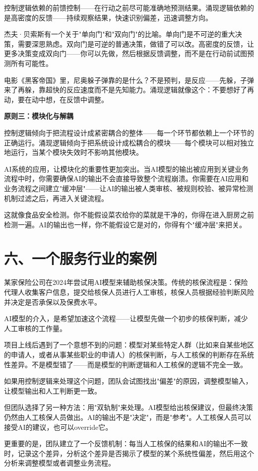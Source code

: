 控制逻辑依赖的前馈控制——在行动之前尽可能准确地预测结果。涌现逻辑依赖的是高密度的反馈——持续观察结果，快速识别偏差，迅速调整方向。

杰夫·贝索斯有一个关于"单向门"和"双向门"的比喻。单向门是不可逆的重大决策，需要深思熟虑。双向门是可逆的普通决策，做错了可以改。高密度的反馈，让更多决策变成双向门——你可以先做，然后根据反馈调整，而不是在行动前试图预测所有可能性。

电影《黑客帝国》里，尼奥躲子弹靠的是什么？不是预判，是反应——先躲，子弹来了再躲，靠超快的反应速度而不是先知能力。涌现逻辑就像这个：不要想好了再动，要在动中想，在反馈中调整。

\textbf{原则三：模块化与解耦}

控制逻辑倾向于把流程设计成紧密耦合的整体——每一个环节都依赖上一个环节的正确运行。涌现逻辑倾向于把系统设计成松耦合的模块——每个模块可以相对独立地运行，当某个模块失效时不影响其他模块。

AI系统的应用，让模块化的重要性更加突出。当AI模型的输出被应用到关键业务流程中时，你需要确保AI的输出不会直接导致整个流程崩溃。你需要在AI应用和业务流程之间建立"缓冲层"——让AI的输出被人类审核、被规则校验、被异常检测机制过滤之后，再进入关键流程。

这就像食品安全检测。你不能假设菜农给你的菜就是干净的，你得在进入厨房之前检测一遍。AI的输出也一样，你不能假设它是对的，你得有个"缓冲层"来把关。

\section{六、一个服务行业的案例}


某家保险公司在2024年尝试用AI模型来辅助核保决策。传统的核保流程是：保险代理人收集客户信息，提交给核保人员进行人工审核，核保人员根据经验判断风险并决定是否承保以及保费水平。

AI模型的介入，是希望加速这个流程——让模型先做一个初步的核保判断，减少人工审核的工作量。

项目上线后遇到了一个意想不到的问题：模型对某些特定人群（比如来自某些地区的申请人，或者从事某些职业的申请人）的核保判断，与人工核保的判断存在系统性差异。不是模型错了——而是模型的判断逻辑和人工核保的逻辑不完全一致。

如果用控制逻辑来处理这个问题，团队会试图找出"偏差"的原因，调整模型输入，让模型输出和人工判断更一致。

但团队选择了另一种方法：用"双轨制"来处理。AI模型给出核保建议，但最终决策仍然由人工核保人员做出。AI的输出不是"决定"，而是"参考"。人工核保人员可以接受AI的建议，也可以override它。

更重要的是，团队建立了一个反馈机制：每当人工核保的结果和AI的输出不一致时，记录这个差异，分析这个差异是否揭示了模型的某个系统性偏差，然后用这个分析来调整模型或者调整业务流程。

